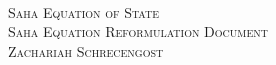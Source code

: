 
\begin{titlepage}

	\begin{center}

		~\\[10cm]
		\textsc{\Large Saha Equation of State} \\
		\textsc{Saha Equation Reformulation Document} \\
		\textsc{Zachariah Schrecengost}

	\end{center}

\end{titlepage}
